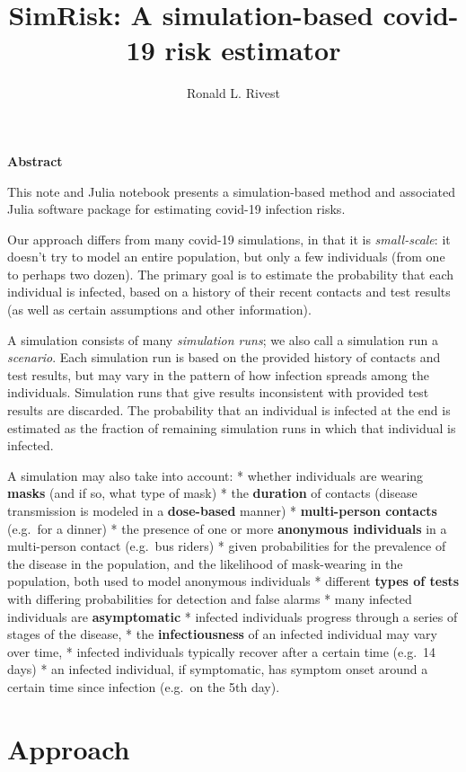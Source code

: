 \documentclass[11pt]{article}
\title{SimRisk: A simulation-based covid-19 risk estimator}
\author{Ronald L. Rivest}
\begin{document}
    
    \maketitle
    
    

    
    \textbf{Abstract}

This note and Julia notebook presents a simulation-based method and
associated Julia software package for estimating covid-19 infection
risks.

Our approach differs from many covid-19 simulations, in that it is
\emph{small-scale}: it doesn't try to model an entire population, but
only a few individuals (from one to perhaps two dozen). The primary goal
is to estimate the probability that each individual is infected, based
on a history of their recent contacts and test results (as well as
certain assumptions and other information).

A simulation consists of many \emph{simulation runs}; we also call a
simulation run a \emph{scenario}. Each simulation run is based on the
provided history of contacts and test results, but may vary in the
pattern of how infection spreads among the individuals. Simulation runs
that give results inconsistent with provided test results are discarded.
The probability that an individual is infected at the end is estimated
as the fraction of remaining simulation runs in which that individual is
infected.

A simulation may also take into account: * whether individuals are
wearing \textbf{masks} (and if so, what type of mask) * the
\textbf{duration} of contacts (disease transmission is modeled in a
\textbf{dose-based} manner) * \textbf{multi-person contacts} (e.g.~for a
dinner) * the presence of one or more \textbf{anonymous individuals} in
a multi-person contact (e.g.~bus riders) * given probabilities for the
prevalence of the disease in the population, and the likelihood of
mask-wearing in the population, both used to model anonymous individuals
* different \textbf{types of tests} with differing probabilities for
detection and false alarms * many infected individuals are
\textbf{asymptomatic} * infected individuals progress through a series
of stages of the disease, * the \textbf{infectiousness} of an infected
individual may vary over time, * infected individuals typically recover
after a certain time (e.g.~14 days) * an infected individual, if
symptomatic, has symptom onset around a certain time since infection
(e.g.~on the 5th day).

    
\newpage
    \hypertarget{approach}{%
\section{Approach}\label{approach}}
\end{document}
